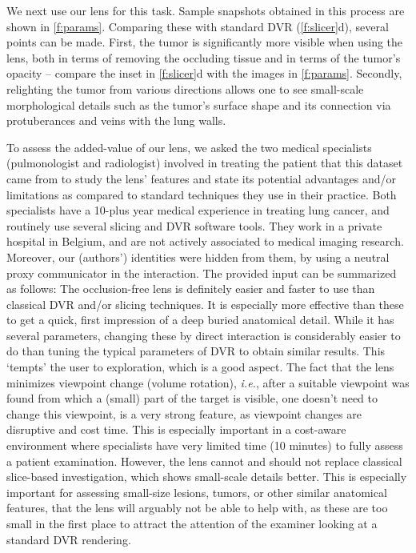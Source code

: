 We next use our lens for this task. Sample snapshots obtained in this process are shown in \autoref{f:params}. Comparing these with standard DVR (\autoref{f:slicer}d), several points can be made. First, the tumor is significantly more visible when using the lens, both in terms of removing the occluding tissue and in terms of the tumor's opacity -- compare the inset in \autoref{f:slicer}d with the images in \autoref{f:params}. Secondly, relighting the tumor from various directions allows one to see small-scale morphological details such as the tumor's surface shape and its connection via protuberances and veins with the lung walls.

To assess the added-value of our lens, we asked the two medical specialists (pulmonologist and radiologist) involved in treating the patient that this dataset came from to study the lens' features and state its potential advantages and/or limitations as compared to standard techniques they use in their practice. Both specialists have a 10-plus year medical experience in treating lung cancer, and routinely use several slicing and DVR software tools. They work in a private hospital in Belgium, and are not actively associated to medical imaging research. Moreover, our (authors') identities were hidden from them, by using a neutral proxy communicator in the interaction. The provided input can be summarized as follows: The occlusion-free lens is definitely easier and faster to use than classical DVR and/or slicing techniques. It is especially more effective than these to get a quick, first impression of a deep buried anatomical detail. While it has several parameters, changing these by direct interaction is considerably easier to do than tuning the typical parameters of DVR to obtain similar results. This `tempts' the user to exploration, which is a good aspect. The fact that the lens minimizes viewpoint change (volume rotation), \emph{i.e.}, after a suitable viewpoint was found from which a (small) part of the target is visible, one doesn't need to change this viewpoint, is a very strong feature, as viewpoint changes are disruptive and cost time. This is especially important in a cost-aware environment where specialists have very limited time (10 minutes) to fully assess a patient examination. However, the lens cannot and should not replace classical slice-based investigation, which shows small-scale details better. This is especially important for assessing small-size lesions, tumors, or other similar anatomical features, that the lens will arguably not be able to help with, as these are too small in the first place to attract the attention of the examiner looking at a standard DVR rendering.

